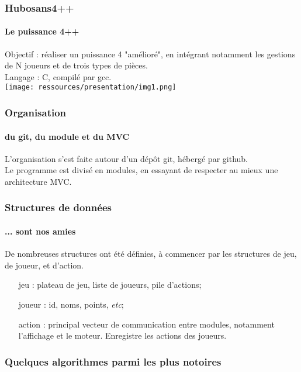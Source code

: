 \documentclass{beamer}
\begin{document}
    \begin{frame}
    \frametitle{Hubosans4++}
    \framesubtitle{Le puissance 4++}
        Objectif : réaliser un puissance 4 "amélioré", 
            en intégrant notamment les gestions de N joueurs 
            et de trois types de pièces. \\     
        Langage : C, compilé par gcc. \\
        \texttt{[image: ressources/presentation/img1.png]}
    \end{frame}


    \begin{frame}
    \frametitle{Organisation}
    \framesubtitle{du git, du module et du MVC}
        L'organisation s'est faite autour d'un dépôt git, 
            hébergé par github. \\ 
        Le programme est divisé en modules, en essayant 
            de respecter au mieux une architecture MVC.
    \end{frame}


    \begin{frame}
    \frametitle{Structures de données}
    \framesubtitle{... sont nos amies}
        De nombreuses structures ont été définies, à commencer 
            par les structures de jeu, de joueur, et d'action. \\
        \begin{itemize}
        \item[jeu :] plateau de jeu, liste de joueurs, pile d'actions;\\
        \item[joueur :] id, noms, points, \textit{etc};\\
        \item[action :] principal vecteur de communication entre modules, 
            notamment l'affichage et le moteur. Enregistre les actions 
            des joueurs.
        \end{itemize}
    \end{frame}


    \begin{frame}
    \frametitle{Quelques algorithmes parmi les plus notoires}
    \framesubtitle{}
    \end{frame}
\end{document}
